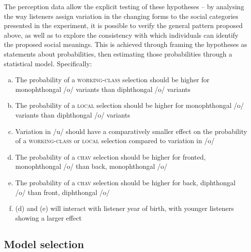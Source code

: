 \documentclass[PWPL]{article}
\begin{document}
The perception data allow the explicit testing of these hypotheses -- by analysing the way listeners assign variation in the changing forms to the social categories presented in the experiment, it is possible to verify the general pattern proposed above, as well as to explore the consistency with which individuals can identify the proposed social meanings. This is achieved through framing the hypotheses as statements about probabilities, then estimating those probabilities through a statistical model. Specifically:

\begin{enumerate}[(a)]
\item{The probability of a \textsc{working-class} selection should be higher for monophthongal /o/ variants than diphthongal /o/ variants}
\item{The probability of a \textsc{local} selection should be higher for monophthongal /o/ variants than diphthongal /o/ variants}
\item{Variation in /u/ should have a comparatively smaller effect on the probability of a \textsc{working-class} or \textsc{local} selection compared to variation in /o/}
\item{The probability of a \textsc{chav} selection should be higher for fronted, monophthongal /o/ than back, monophthongal /o/}
\item{The probability of a \textsc{chav} selection should be higher for back, diphthongal /o/ than front, diphthongal /o/}
\item{(d) and (e) will interact with listener year of birth, with younger listeners showing a larger effect}
\end{enumerate}

\subsection{Model selection}
\end{document}
